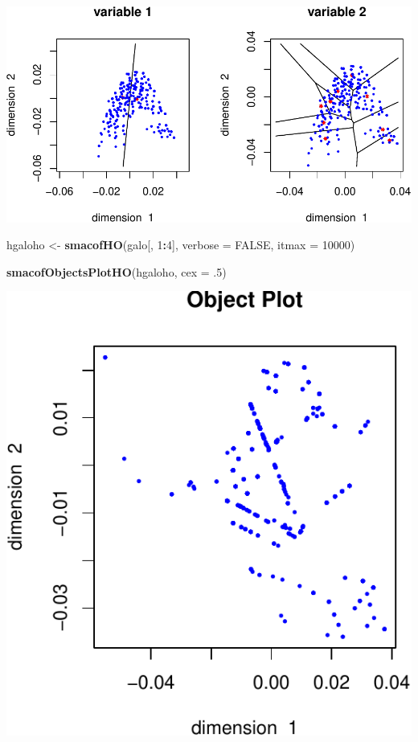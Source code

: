 \documentclass[
  12pt,
]{article}
\newenvironment{Shaded}{\begin{snugshade}}{\end{snugshade}}
\newcommand{\AttributeTok}[1]{\textcolor[rgb]{0.13,0.29,0.53}{#1}}
\newcommand{\ConstantTok}[1]{\textcolor[rgb]{0.56,0.35,0.01}{#1}}
\newcommand{\DecValTok}[1]{\textcolor[rgb]{0.00,0.00,0.81}{#1}}
\newcommand{\FunctionTok}[1]{\textcolor[rgb]{0.13,0.29,0.53}{\textbf{#1}}}
\newcommand{\NormalTok}[1]{#1}
\newcommand{\OtherTok}[1]{\textcolor[rgb]{0.56,0.35,0.01}{#1}}
\newcommand{\SpecialCharTok}[1]{\textcolor[rgb]{0.81,0.36,0.00}{\textbf{#1}}}
\begin{document}
\includegraphics{smacofHO_files/figure-latex/unnamed-chunk-7-1.pdf}

\begin{Shaded}
\begin{Highlighting}[]
\NormalTok{hgaloho }\OtherTok{\textless{}{-}} \FunctionTok{smacofHO}\NormalTok{(galo[, }\DecValTok{1}\SpecialCharTok{:}\DecValTok{4}\NormalTok{], }\AttributeTok{verbose =} \ConstantTok{FALSE}\NormalTok{, }\AttributeTok{itmax =} \DecValTok{10000}\NormalTok{)}
\end{Highlighting}
\end{Shaded}

\begin{Shaded}
\begin{Highlighting}[]
\FunctionTok{smacofObjectsPlotHO}\NormalTok{(hgaloho, }\AttributeTok{cex =}\NormalTok{ .}\DecValTok{5}\NormalTok{)}
\end{Highlighting}
\end{Shaded}

\includegraphics{smacofHO_files/figure-latex/unnamed-chunk-8-1.pdf}
\end{document}
